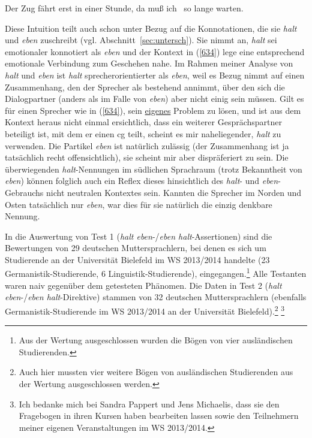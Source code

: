 \begin{exe}
	\ex\label{634} 
	Der Zug fährt erst in einer Stunde, da muß ich \hrulefill \ so lange warten.
\end{exe}
Diese Intuition teilt auch schon \citet[174]{Hentschel1986} unter Bezug auf die Konnotationen, die sie \textit{halt} und \textit{eben} zuschreibt (vgl. Abschnitt~\ref{sec:untersch}). Sie nimmt an, \textit{halt} sei emotionaler konnotiert als \textit{eben} und der Kontext in (\ref{634}) lege eine entsprechend emotionale Verbindung zum Geschehen nahe. Im Rahmen meiner Analyse von \textit{halt} und \textit{eben} ist \textit{halt} sprecherorientierter als \textit{eben}, weil es Bezug nimmt auf einen Zusammenhang, den der Sprecher als bestehend annimmt, über den sich die Dialogpartner (anders als im Falle von \textit{eben}) aber nicht einig sein müssen. Gilt es für einen Sprecher wie in (\ref{634}), sein \underline{eigenes} Problem zu lösen, und ist aus dem Kontext heraus nicht einmal ersichtlich, dass ein weiterer Gesprächs\-partner beteiligt ist, mit dem er einen cg teilt, scheint es mir naheliegender, \textit{halt} zu verwenden. Die Partikel \textit{eben} ist natürlich zulässig (der Zusammenhang ist ja tatsächlich recht offensichtlich), sie scheint mir aber dispräferiert zu sein. Die überwiegenden \textit{halt}-Nennungen im südlichen Sprachraum (trotz Bekanntheit von \textit{eben}) können folglich auch ein Reflex dieses hinsichtlich des \textit{halt}- und \textit{eben}-Gebrauchs nicht neutralen Kontextes sein. Kannten die Sprecher im Norden und Osten tatsächlich nur \textit{eben}, war dies für sie natürlich die einzig denkbare Nennung.

In die Auswertung von Test 1 (\textit{halt eben}-/\textit{eben halt}-Assertionen)  sind die Bewertungen von 29 deutschen Muttersprachlern, bei denen es sich um Studierende an der Universität Bielefeld im WS 2013/2014 handelte (23 Germanistik-Studieren\-de, 6 Linguistik-Studierende), eingegangen.\footnote{Aus der Wertung ausgeschlossen wurden die Bögen von vier ausländischen Studierenden.} Alle Testanten waren naiv gegenüber dem getesteten Phänomen. Die Daten in Test 2 (\textit{halt eben}-/\textit{eben halt}-Direktive) stammen von 32 deutschen Muttersprachlern (ebenfalls Germanistik-Studierende im WS 2013/2014 an der Universität Bielefeld).\footnote{Auch hier mussten vier weitere Bögen von ausländischen Studierenden aus der Wertung ausgeschlossen werden.} \footnote{Ich bedanke mich bei Sandra Pappert und Jens Michaelis, dass sie den Fragebogen in ihren Kursen haben bearbeiten lassen sowie den Teilnehmern meiner eigenen Veranstaltungen im WS 2013/2014.} 

